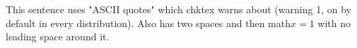 \documentclass{article}
\begin{document}
This sentence uses "ASCII quotes" which chktex warns about (warning 1, on
by default in every distribution). Also has  two spaces and then math$x=1$
with no leading space around it.
\end{document}
